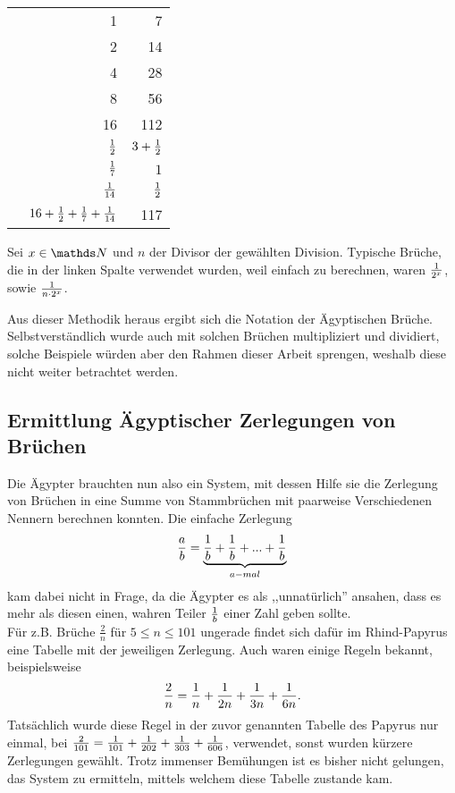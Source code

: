 \begin{bsp}
		\begin{center}
			\begin{tabular}{r r r}
				& 1 & \textcolor{OliveGreen}{7}\\
				& 2 & 14\\
				& 4 & 28\\
				& 8 & 56\\
				\checkmark & 16 & 112\\ 
				\checkmark & $\frac{1}{2}$ & $3+\frac{1}{2}$\\
				\checkmark & $\frac{1}{7}$ & $1$\\
				\checkmark & $\frac{1}{14}$ & $\frac{1}{2}$\\ \hline
				& $16+\frac{1}{2}+\frac{1}{7}+\frac{1}{14}$ & 117
			\end{tabular}
		\end{center}
	\end{bsp}
	Sei $x \in \N$ und $n$ der Divisor der gewählten Division. Typische Brüche, die in der linken Spalte verwendet wurden, weil einfach zu berechnen, waren $\frac{1}{2^x}$,  sowie $\frac{1}{n \cdot 2^x}$.
	
	Aus dieser Methodik heraus ergibt sich die Notation der Ägyptischen Brüche. Selbstverständlich wurde auch mit solchen Brüchen multipliziert und dividiert, solche Beispiele würden aber den Rahmen dieser Arbeit sprengen, 
	weshalb diese nicht weiter betrachtet werden.
	
\subsection{Ermittlung Ägyptischer Zerlegungen von Brüchen}
Die Ägypter brauchten nun also ein System, mit dessen Hilfe sie die Zerlegung von Brüchen in eine Summe von Stammbrüchen mit paarweise Verschiedenen Nennern berechnen konnten. Die einfache Zerlegung
$$\frac{a}{b} = \underbrace{\frac{1}{b} + \frac{1}{b} + ... +\frac{1}{b}}_{a-mal}$$
kam dabei nicht in Frage, da die Ägypter es als ,,unnatürlich'' ansahen, dass es mehr als diesen einen, wahren Teiler $\frac{1}{b}$ einer Zahl geben sollte. \cite[p.]{Burton2011}\\
Für z.B. Brüche $\frac{2}{n}$ für $5 \leq n \leq 101$ ungerade findet sich dafür im Rhind-Papyrus eine Tabelle mit der jeweiligen Zerlegung. Auch waren einige Regeln bekannt, beispielsweise
$$\frac{2}{n} = \frac{1}{n} + \frac{1}{2n} + \frac{1}{3n} +\frac{1}{6n}.$$
Tatsächlich wurde diese Regel in der zuvor genannten Tabelle des Papyrus nur einmal, bei $\frac{2}{101} = \frac{1}{101}+\frac{1}{202}+\frac{1}{303}+\frac{1}{606}$, verwendet, sonst wurden kürzere Zerlegungen gewählt. Trotz immenser Bemühungen ist es bisher nicht gelungen, das System zu ermitteln, mittels welchem diese Tabelle zustande kam. \cite{Burton2011}